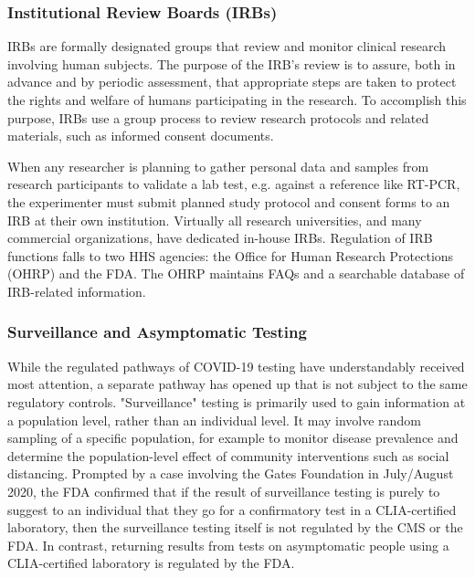         \subsubsection{Institutional Review Boards (IRBs)}

            IRBs are formally designated groups that review and monitor clinical research involving human subjects. The purpose of the IRB’s review is to assure, both in advance and by periodic assessment, that appropriate steps are taken to protect the rights and welfare of humans participating in the research. To accomplish this purpose, IRBs use a group process to review research protocols and related materials, such as informed consent documents.

            When any researcher is planning to gather personal data and samples from research participants to validate a lab test, e.g. against a reference like RT-PCR, the experimenter must submit planned study protocol and consent forms to an IRB at their own institution. Virtually all research universities, and many commercial organizations, have dedicated in-house IRBs.\cite{CIRCARE2021} Regulation of IRB functions falls to two HHS agencies: the Office for Human Research Protections (OHRP) and the FDA. The OHRP maintains FAQs and a searchable database of IRB-related information.\cite{OHRP2016}

        \subsubsection{Surveillance and Asymptomatic Testing}

            While the regulated pathways of COVID-19 testing have understandably received most attention, a separate pathway has opened up that is not subject to the same regulatory controls. "Surveillance" testing is primarily used to gain information at a population level, rather than an individual level. It may involve random sampling of a specific population, for example to monitor disease prevalence and determine the population-level effect of community interventions such as social distancing. Prompted by a case involving the Gates Foundation in July/August 2020, the FDA confirmed that if the result of surveillance testing is purely to suggest to an individual that they go for a confirmatory test in a CLIA-certified laboratory, then the surveillance testing itself is not regulated by the CMS or the FDA. In contrast, returning results from tests on asymptomatic people using a CLIA-certified laboratory is regulated by the FDA.


